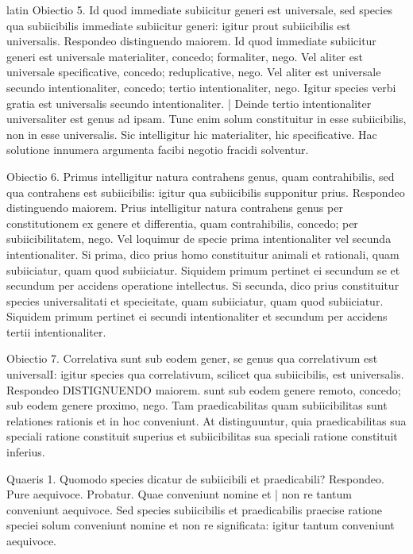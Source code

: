 \begin{otherlanguage*}{latin}
\pstart
Obiectio 5. Id quod immediate subiicitur generi est universale, sed species qua subiicibilis immediate subiicitur generi:
igitur prout subiicibilis est universalis. Respondeo distinguendo maiorem. Id quod immediate subiicitur generi est universale materialiter, concedo; formaliter, nego. Vel aliter est universale specificative, concedo; reduplicative, nego. Vel aliter est universale secundo intentionaliter, concedo; tertio intentionaliter, nego. Igitur species verbi gratia est universalis secundo intentionaliter. \textnormal{|} Deinde tertio intentionaliter  universaliter est genus ad ipsam. Tunc enim solum constituitur in esse subiicibilis, non in esse universalis. Sic intelligitur hic materialiter, hic specificative. Hac solutione innumera argumenta facibi negotio fracidi solventur. 
\pend

\pstart
Obiectio 6. Primus intelligitur natura contrahens genus, quam contrahibilis, sed qua contrahens est subiicibilis:
igitur qua subiicibilis supponitur prius. Respondeo distinguendo maiorem. Prius intelligitur natura contrahens genus per constitutionem ex genere et differentia, quam contrahibilis, concedo; per subiicibilitatem, nego. Vel loquimur de specie prima intentionaliter vel secunda intentionaliter. Si prima, dico prius homo constituitur animali et rationali, quam subiiciatur, quam quod subiiciatur. Siquidem primum pertinet ei secundum se et secundum per accidens operatione intellectus. Si secunda, dico prius constituitur species universalitati et specieitate, quam subiiciatur, quam quod subiiciatur. Siquidem primum pertinet ei secundi intentionaliter et secundum per accidens tertii intentionaliter. 
\pend

\pstart
Obiectio 7. Correlativa sunt sub eodem gener, se genus qua correlativum est universalI:
igitur species qua correlativum, scilicet qua subiicibilis, est universalis. Respondeo DISTIGNUENDO maiorem. sunt sub eodem genere remoto, concedo; sub eodem genere proximo, nego. Tam praedicabilitas quam subiicibilitas sunt relationes rationis et in hoc conveniunt. At distinguuntur, quia praedicabilitas sua speciali ratione constituit superius et subiicibilitas sua speciali ratione constituit inferius. 
\pend

\pstart
Quaeris 1. Quomodo species dicatur de subiicibili et praedicabili? Respondeo. Pure aequivoce. Probatur. Quae conveniunt nomine et \textnormal{|} non re tantum conveniunt aequivoce. Sed species subiicibilis et praedicabilis praecise ratione speciei solum conveniunt nomine et non re significata:
igitur tantum conveniunt aequivoce. 
\pend


\end{otherlanguage*}
